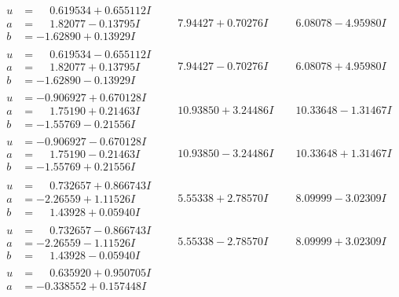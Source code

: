 \documentclass[1p]{elsarticle_modified}
\theoremstyle{definition}
\begin{document}
$$\begin{array}{c|c|c}
\begin{aligned}
u &= \phantom{-}0.619534 + 0.655112 I \\
a &= \phantom{-}1.82077 - 0.13795 I \\
b &= -1.62890 + 0.13929 I\end{aligned}
 & \phantom{-}7.94427 + 0.70276 I & \phantom{-}6.08078 - 4.95980 I \\ \hline\begin{aligned}
u &= \phantom{-}0.619534 - 0.655112 I \\
a &= \phantom{-}1.82077 + 0.13795 I \\
b &= -1.62890 - 0.13929 I\end{aligned}
 & \phantom{-}7.94427 - 0.70276 I & \phantom{-}6.08078 + 4.95980 I \\ \hline\begin{aligned}
u &= -0.906927 + 0.670128 I \\
a &= \phantom{-}1.75190 + 0.21463 I \\
b &= -1.55769 - 0.21556 I\end{aligned}
 & \phantom{-}10.93850 + 3.24486 I & \phantom{-}10.33648 - 1.31467 I \\ \hline\begin{aligned}
u &= -0.906927 - 0.670128 I \\
a &= \phantom{-}1.75190 - 0.21463 I \\
b &= -1.55769 + 0.21556 I\end{aligned}
 & \phantom{-}10.93850 - 3.24486 I & \phantom{-}10.33648 + 1.31467 I \\ \hline\begin{aligned}
u &= \phantom{-}0.732657 + 0.866743 I \\
a &= -2.26559 + 1.11526 I \\
b &= \phantom{-}1.43928 + 0.05940 I\end{aligned}
 & \phantom{-}5.55338 + 2.78570 I & \phantom{-}8.09999 - 3.02309 I \\ \hline\begin{aligned}
u &= \phantom{-}0.732657 - 0.866743 I \\
a &= -2.26559 - 1.11526 I \\
b &= \phantom{-}1.43928 - 0.05940 I\end{aligned}
 & \phantom{-}5.55338 - 2.78570 I & \phantom{-}8.09999 + 3.02309 I \\ \hline\begin{aligned}
u &= \phantom{-}0.635920 + 0.950705 I \\
a &= -0.338552 + 0.157448 I \\

\end{aligned}
\end{array}$$
\end{document}
